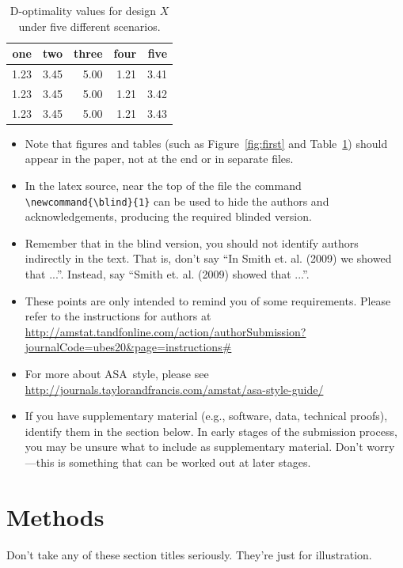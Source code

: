 \documentclass{article}
\begin{document}
\begin{table}
\caption{D-optimality values for design $X$ under five different scenarios.  \label{tab:tabone}}
\begin{center}
\begin{tabular}{rrrrr}
one & two & three & four & five\\\hline
1.23 & 3.45 & 5.00 & 1.21 & 3.41 \\
1.23 & 3.45 & 5.00 & 1.21 & 3.42 \\
1.23 & 3.45 & 5.00 & 1.21 & 3.43 \\
\end{tabular}
\end{center}
\end{table}

\begin{itemize}
\item Note that figures and tables (such as Figure~\ref{fig:first} and
Table~\ref{tab:tabone}) should appear in the paper, not at the end or
in separate files.
\item In the latex source, near the top of the file the command
\verb+\newcommand{\blind}{1}+ can be used to hide the authors and
acknowledgements, producing the required blinded version.
\item Remember that in the blind version, you should not identify authors
indirectly in the text.  That is, don't say ``In Smith et. al.  (2009) we
showed that ...''.  Instead, say ``Smith et. al. (2009) showed that ...''.
\item These points are only intended to remind you of some requirements.
Please refer to the instructions for authors
at \url{http://amstat.tandfonline.com/action/authorSubmission?journalCode=ubes20&page=instructions#}
\item For more about ASA\ style, please see \url{http://journals.taylorandfrancis.com/amstat/asa-style-guide/}
\item If you have supplementary material (e.g., software, data, technical
proofs), identify them in the section below.  In early stages of the
submission process, you may be unsure what to include as supplementary
material.  Don't worry---this is something that can be worked out at later stages.
\end{itemize}

\section{Methods}
\label{sec:meth}
Don't take any of these section titles seriously.  They're just for
illustration.
\end{document}
